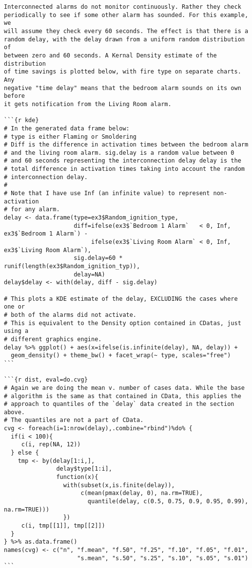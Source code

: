 \begin{lstlisting}[basicstyle=\scriptsize]
Interconnected alarms do not monitor continuously. Rather they check
periodically to see if some other alarm has sounded. For this example, we
will assume they check every 60 seconds. The effect is that there is a
random delay, with the delay drawn from a uniform random distribution of
between zero and 60 seconds. A Kernal Density estimate of the distribution
of time savings is plotted below, with fire type on separate charts. Any
negative "time delay" means that the bedroom alarm sounds on its own before
it gets notification from the Living Room alarm.

```{r kde}
# In the generated data frame below:
# type is either Flaming or Smoldering
# Diff is the difference in activation times between the bedroom alarm
# and the living room alarm. sig.delay is a random value between 0
# and 60 seconds representing the interconnection delay delay is the
# total difference in activation times taking into account the random
# interconnection delay.
#
# Note that I have use Inf (an infinite value) to represent non-activation
# for any alarm.
delay <- data.frame(type=ex3$Random_ignition_type,
                    diff=ifelse(ex3$`Bedroom 1 Alarm`   < 0, Inf, ex3$`Bedroom 1 Alarm`) -
                         ifelse(ex3$`Living Room Alarm` < 0, Inf, ex3$`Living Room Alarm`),
                    sig.delay=60 * runif(length(ex3$Random_ignition_typ)),
                    delay=NA)
delay$delay <- with(delay, diff - sig.delay)

# This plots a KDE estimate of the delay, EXCLUDING the cases where one or
# both of the alarms did not activate.
# This is equivalent to the Density option contained in CDatas, just using a
# different graphics engine.
delay %>% ggplot() + aes(x=ifelse(is.infinite(delay), NA, delay)) +
  geom_density() + theme_bw() + facet_wrap(~ type, scales="free")
```

```{r dist, eval=do.cvg}
# Again we are doing the mean v. number of cases data. While the base
# algorithm is the same as that contained in CData, this applies the
# approach to quantiles of the `delay` data created in the section above.
# The quantiles are not a part of CData.
cvg <- foreach(i=1:nrow(delay),.combine="rbind")%do% {
  if(i < 100){
     c(i, rep(NA, 12))
  } else {
    tmp <- by(delay[1:i,],
               delay$type[1:i],
               function(x){
                 with(subset(x,is.finite(delay)),
                      c(mean(pmax(delay, 0), na.rm=TRUE),
                        quantile(delay, c(0.5, 0.75, 0.9, 0.95, 0.99), na.rm=TRUE)))
                 })
     c(i, tmp[[1]], tmp[[2]])
  }
} %>% as.data.frame()
names(cvg) <- c("n", "f.mean", "f.50", "f.25", "f.10", "f.05", "f.01",
                     "s.mean", "s.50", "s.25", "s.10", "s.05", "s.01")
```


\end{lstlisting}

